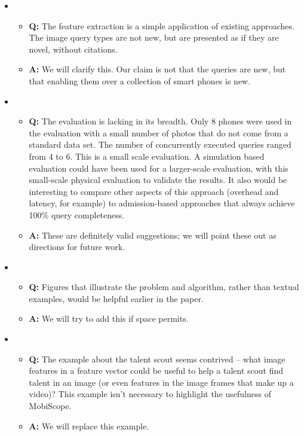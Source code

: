 \begin{itemize}
\item
\begin{itemize}
\item \textbf{Q: } The feature extraction is a simple application of
  existing approaches. The image query types are not new, but are
  presented as if they are novel, without citations.
\item \textbf{A: } We will clarify this. Our claim is not that the
  queries are new, but that enabling them over a collection of smart
  phones is new.
\end{itemize}

\item
\begin{itemize}
\item \textbf{Q: } The evaluation is lacking in its breadth. Only 8
  phones were used in the evaluation with a small number of photos
  that do not come from a standard data set. The number of
  concurrently executed queries ranged from 4 to 6. This is a small
  scale evaluation. A simulation based evaluation could have been used
  for a larger-scale evaluation, with this small-scale physical
  evaluation to validate the results. It also would be interesting to
  compare other aspects of this approach (overhead and latency, for
  example) to admission-based approaches that always achieve 100\%
  query completeness.
\item \textbf{A: } These are definitely valid suggestions; we will
  point these out as directions for future work.
\end{itemize}

\item
\begin{itemize}
\item \textbf{Q: }Figures that illustrate the problem and algorithm,
  rather than textual examples, would be helpful earlier in the paper.
\item \textbf{A: } We will try to add this if space permits.
\end{itemize}
    
\item
\begin{itemize}
\item \textbf{Q: }The example about the talent scout seems contrived
  -- what image features in a feature vector could be useful to help a
  talent scout find talent in an image (or even features in the image
  frames that make up a video)?  This example isn't necessary to
  highlight the usefulness of MobiScope.
\item \textbf{A: }We will replace this example.
\end{itemize}
\end{itemize}
    
